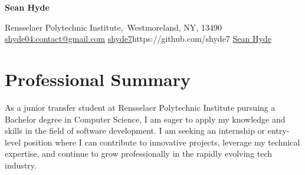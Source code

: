\documentclass{OpenCV}
\newlength{\hvspace}
\begin{document}
\begin{center}
    \noindent\textbf{\LARGE Sean Hyde} \\
\end{center}
\vspace{\hvspace}
\hrulefill
\vspace{\hvspace}
\begin{center}
    \noindent Rensselaer Polytechnic Institute,\ Westmoreland, NY, 13490 \\
    \noindent\faEnvelopeO\enskip \href{mailto:shyde04.contact@gmail.com}{shyde04.contact@gmail.com}\enskip
    \faGithub\enskip\href{https://github.com/shyde7}{shyde7}\enskip https://github.com/shyde7
    \faLinkedin\enskip\href{https://www.linkedin.com/in/sean-hyde-a438ba264/}{Sean Hyde}
    
\end{center}
\vspace{\hvspace}
\vspace{-4pt}
\hrulefill
\vspace{-12pt}

\section*{Professional Summary}
As a junior transfer student at Rensselaer Polytechnic Institute pursuing a Bachelor degree in Computer Science, I am
eager to apply my knowledge and skills in the field of software development. I am seeking an internship or entry-level
position where I can contribute to innovative projects, leverage my technical expertise, and continue to grow
professionally in the rapidly evolving tech industry.









\end{document}
